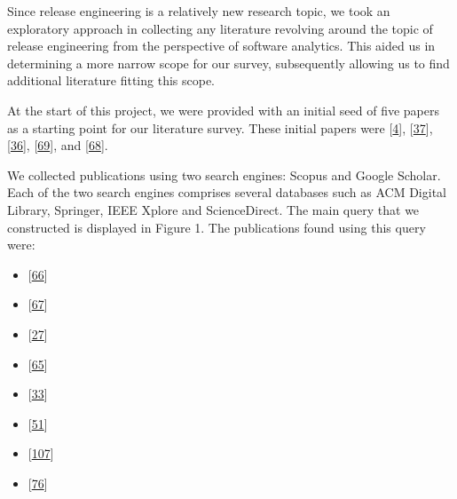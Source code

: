 \documentclass[]{book}
\providecommand{\tightlist}{%
  \setlength{\itemsep}{0pt}\setlength{\parskip}{0pt}}
\begin{document}
Since release engineering is a relatively new research topic, we took an
exploratory approach in collecting any literature revolving around the
topic of release engineering from the perspective of software analytics.
This aided us in determining a more narrow scope for our survey,
subsequently allowing us to find additional literature fitting this
scope.

At the start of this project, we were provided with an initial seed of
five papers as a starting point for our literature survey. These initial
papers were {[}\protect\hyperlink{ref-adams2016a}{4}{]},
{[}\protect\hyperlink{ref-da2016a}{37}{]},
{[}\protect\hyperlink{ref-da2014a}{36}{]},
{[}\protect\hyperlink{ref-khomh2012a}{69}{]}, and
{[}\protect\hyperlink{ref-khomh2015a}{68}{]}.

We collected publications using two search engines: Scopus and Google
Scholar. Each of the two search engines comprises several databases such
as ACM Digital Library, Springer, IEEE Xplore and ScienceDirect. The
main query that we constructed is displayed in Figure 1. The
publications found using this query were:

\begin{itemize}
\tightlist
\item
  {[}\protect\hyperlink{ref-kaur2019a}{66}{]}
\item
  {[}\protect\hyperlink{ref-kerzazi2013a}{67}{]}
\item
  {[}\protect\hyperlink{ref-castelluccio2017a}{27}{]}
\item
  {[}\protect\hyperlink{ref-karvonen2017a}{65}{]}
\item
  {[}\protect\hyperlink{ref-claes2017a}{33}{]}
\item
  {[}\protect\hyperlink{ref-fujibayashi2017a}{51}{]}
\item
  {[}\protect\hyperlink{ref-souza2015a}{107}{]}
\item
  {[}\protect\hyperlink{ref-laukkanen2018a}{76}{]}
\end{itemize}
\end{document}
